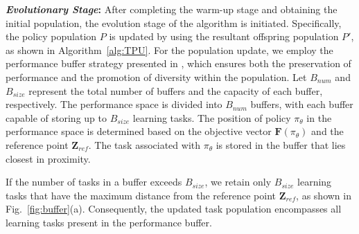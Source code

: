 \documentclass[10pt,journal,compsoc]{IEEEtran}
\begin{document}

\par \textbf{\textit{Evolutionary Stage}:} After completing the warm-up stage and obtaining the initial population, the evolution stage of the algorithm is initiated. Specifically, the policy population $P$ is updated by using the resultant offspring population $P'$, as shown in Algorithm~\ref{alg:TPU}. For the population update, we employ the performance buffer strategy presented in \cite{schulz2018interactive}, which ensures both the preservation of performance and the promotion of diversity within the population. Let $B_{num}$ and $B_{size}$ represent the total number of buffers and the capacity of each buffer, respectively. The performance space is divided into $B_{num}$ buffers, with each buffer capable of storing up to $B_{size}$ learning tasks. The position of policy $\pi_{\theta}$ in the performance space is determined based on the objective vector $\boldsymbol{F}(\pi_{\theta})$ and the reference point $\boldsymbol{Z}_{ref}$. The task associated with $\pi_{\theta}$ is stored in the buffer that lies closest in proximity.

\par If the number of tasks in a buffer exceeds $B_{size}$, we retain only $B_{size}$ learning tasks that have the maximum distance from the reference point $\boldsymbol{Z}_{ref}$, as shown in Fig.~\ref{fig:buffer}(a). Consequently, the updated task population encompasses all learning tasks present in the performance buffer.
\end{document}
